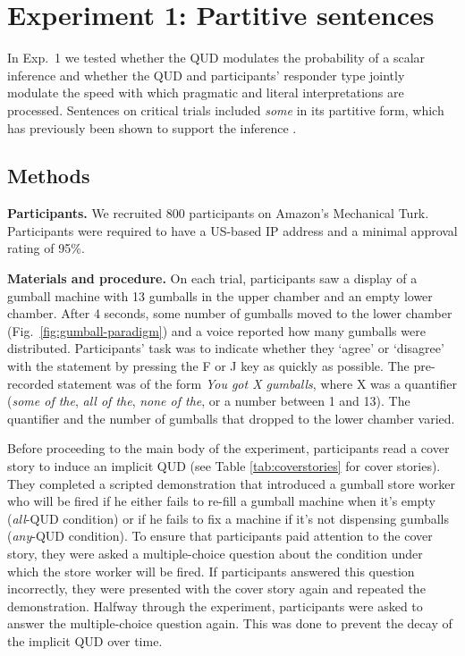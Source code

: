 \documentclass[10pt,letterpaper]{article}
\begin{document}
\section{Experiment 1: Partitive sentences}

In Exp.~1 we tested whether the QUD  modulates the probability of a scalar inference and whether the QUD and participants' responder type jointly modulate the speed with which pragmatic and literal interpretations are processed. Sentences on critical trials included \emph{some} in its partitive form, which has previously been shown to support the inference \cite{Degen2015}.


\subsection{Methods}

\noindent \textbf{Participants.} We recruited 800 participants on Amazon's Mechanical Turk. Participants were required to have a US-based IP address and a minimal approval rating of 95\%. %

\noindent \textbf{Materials and procedure.} On each trial, participants saw a display of a gumball machine with 13 gumballs in the upper chamber and an empty lower chamber. After 4 seconds, some number of gumballs moved to the lower chamber (Fig.~\ref{fig:gumball-paradigm}) and a voice reported how many gumballs were distributed. Participants' task was to indicate whether they `agree' or `disagree' with the statement by pressing the F or J key as quickly as possible. The pre-recorded statement was of the form \emph{You got X gumballs}, where X was a quantifier (\textit{some of the},  \textit{all of the}, \textit{none of the}, or a number between 1 and 13). The quantifier and the number of gumballs that dropped to the lower chamber varied.
  
Before proceeding to the main body of the experiment, participants read a cover story to induce an implicit QUD (see Table \ref{tab:coverstories} for cover stories). They completed a scripted demonstration that introduced a gumball store worker who will be fired if he either fails to re-fill a gumball machine when it's empty (\emph{all}-QUD condition) or if he fails to fix a machine if it's not dispensing gumballs (\emph{any}-QUD condition). To ensure that participants paid attention to the cover story, they were asked a multiple-choice question about the condition under which the store worker will be fired. If participants answered this question incorrectly, they were presented with the cover story again and repeated the demonstration. Halfway through the experiment, participants were asked to answer the multiple-choice question again. This was done to prevent the decay of the implicit QUD over time.  
 
\end{document}

